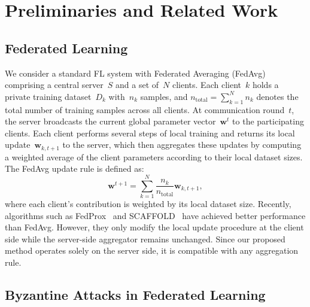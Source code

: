 \documentclass[journal]{IEEEtran}
\begin{document}
\section{Preliminaries and Related Work}
\label{sec:preliminaries}

\subsection{Federated Learning}

We consider a standard FL system with Federated Averaging (FedAvg)~\cite{mcmahan2017communication} comprising a central server~$S$ and a set of~$N$ clients. Each client~$k$ holds a private training dataset~$D_k$ with~$n_k$ samples, and $n_{\text{total}} = \sum_{k=1}^{N} n_k$ denotes the total number of training samples across all clients. At communication round~$t$, the server broadcasts the current global parameter vector~$\mathbf{w}^t$ to the participating clients. Each client performs several steps of local training and returns its local update~$\mathbf{w}_{k,t+1}$ to the server, which then aggregates these updates by computing a weighted average of the client parameters according to their local dataset sizes. The FedAvg update rule is defined as:
\begin{equation}
\mathbf{w}^{t+1} = \sum_{k=1}^{N} \frac{n_k}{n_{\text{total}}} \mathbf{w}_{k,t+1},
\label{eq:fedavg}
\end{equation}
where each client's contribution is weighted by its local dataset size. Recently, algorithms such as FedProx~\cite{li2020federated} and SCAFFOLD~\cite{karimireddy2021scaffold} have achieved better performance than FedAvg. However, they only modify the local update procedure at the client side while the server-side aggregator remains unchanged. Since our proposed method operates solely on the server side, it is compatible with any aggregation rule.

\subsection{Byzantine Attacks in Federated Learning}
\end{document}
